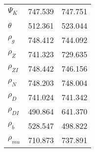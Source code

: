 \begin{center}
\begin{longtable}{lcc}
$ {\Psi_{K}}           $	 & 	     747.539	 & 	     747.751 \\ 
$ {\theta}             $	 & 	     512.361	 & 	     523.044 \\ 
$ {\rho_g}             $	 & 	     748.412	 & 	     744.092 \\ 
$ {\rho_Z}             $	 & 	     741.323	 & 	     729.635 \\ 
$ {\rho_{ZI}}          $	 & 	     748.442	 & 	     746.156 \\ 
$ {\rho_N}             $	 & 	     748.203	 & 	     748.004 \\ 
$ {\rho_D}             $	 & 	     741.024	 & 	     741.342 \\ 
$ {\rho_{DI}}          $	 & 	     490.864	 & 	     641.370 \\ 
$ {\rho_b}             $	 & 	     528.547	 & 	     498.822 \\ 
$ {\rho_{mu}}          $	 & 	     710.873	 & 	     737.891 \\ 
\end{longtable}
 \end{center}
